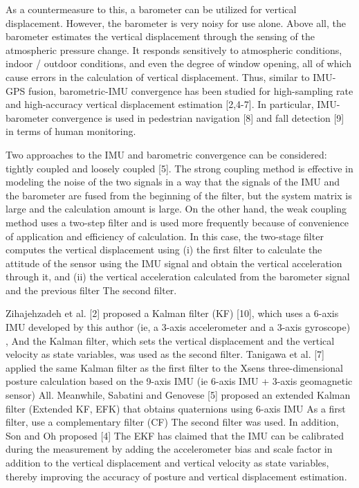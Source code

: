 \documentclass[10pt,journal,compsoc]{IEEEtran}
\begin{document}
As a countermeasure to this, a barometer can be utilized for vertical
displacement. However, the barometer is very noisy for use alone. Above all,
the barometer estimates the vertical displacement through the sensing of the
atmospheric pressure change. It responds sensitively to atmospheric conditions,
indoor / outdoor conditions, and even the degree of window opening, all of
which cause errors in the calculation of vertical displacement. Thus, similar
to IMU-GPS fusion, barometric-IMU convergence has been studied for
high-sampling rate and high-accuracy vertical displacement estimation [2,4-7].
In particular, IMU-barometer convergence is used in pedestrian navigation [8]
and fall detection [9] in terms of human monitoring.

Two approaches to the IMU and barometric convergence can be considered: tightly
coupled and loosely coupled [5]. The strong coupling method is effective in
modeling the noise of the two signals in a way that the signals of the IMU and
the barometer are fused from the beginning of the filter, but the system matrix
is ​​large and the calculation amount is large. On the other hand,
the weak coupling method uses a two-step filter and is used more frequently
because of convenience of application and efficiency of calculation. In this
case, the two-stage filter computes the vertical displacement using (i) the
first filter to calculate the attitude of the sensor using the IMU signal and
obtain the vertical acceleration through it, and (ii) the vertical acceleration
calculated from the barometer signal and the previous filter The second filter. 


Zihajehzadeh et al. [2] proposed a Kalman filter (KF) [10], which uses a 6-axis
IMU developed by this author (ie, a 3-axis accelerometer and a 3-axis
gyroscope) , And the Kalman filter, which sets the vertical displacement and
the vertical velocity as state variables, was used as the second filter.
Tanigawa et al. [7] applied the same Kalman filter as the first filter to the
Xsens three-dimensional posture calculation based on the 9-axis IMU (ie 6-axis
IMU + 3-axis geomagnetic sensor) All. Meanwhile, Sabatini and Genovese [5]
proposed an extended Kalman filter (Extended KF, EFK) that obtains quaternions
using 6-axis IMU As a first filter, use a complementary filter (CF) The second
filter was used. In addition, Son and Oh proposed [4] The EKF has claimed that
the IMU can be calibrated during the measurement by adding the accelerometer
bias and scale factor in addition to the vertical displacement and vertical
velocity as state variables, thereby improving the accuracy of posture and
vertical displacement estimation.
\end{document}

